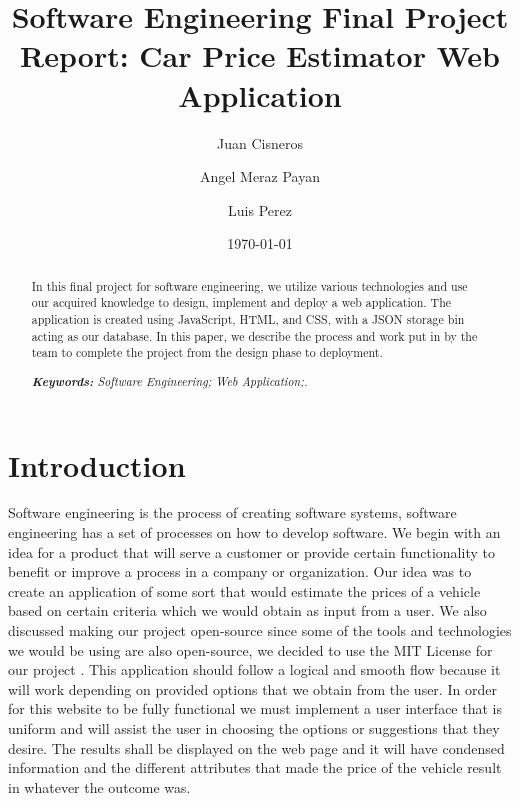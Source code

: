 \documentclass[12pt]{article}
\title{Software Engineering Final Project Report: Car Price Estimator Web Application
}
\author{Juan Cisneros\\%
    \href{mailto:firstauthor@ufl.edu}{} %
\and Angel Meraz Payan\\%
    \href{mailto:secondauthor@ufl.edu}{} %
\and Luis Perez\\%
    \href{mailto:thirdauthor@ufl.edu}{}%
    }
\date{\today}
\begin{document}
{
\maketitle
\begin{abstract}
In this final project for software engineering, we utilize various technologies and use our acquired knowledge to design, implement and deploy a web application. The application is created using JavaScript, HTML, and CSS, with a JSON storage bin acting as our database. In this paper, we describe the process and work put in by the team to complete the project from the design phase to deployment. 

\noindent
\textit{\textbf{Keywords: }%
Software Engineering; Web Application;.} \\ %
\noindent
\end{abstract}
}


\section{Introduction}

Software engineering is the process of creating software systems, software engineering has a set of processes on how to develop software. We begin with an idea for a product that will serve a customer or provide certain functionality to benefit or improve a process in a company or organization. Our idea was to create an application of some sort that would estimate the prices of a vehicle based on certain criteria which we would obtain as input from a user. We also discussed making our project open-source since some of the tools and technologies we would be using are also open-source, we decided to use the MIT License for our project \cite{MIT}. This application should follow a logical and smooth flow because it will work depending on provided options that we obtain from the user. In order for this website to be fully functional we must implement a user interface that is uniform and will assist the user in choosing the options or suggestions that they desire. The results shall be displayed on the web page and it will have condensed information and the different attributes that made the price of the vehicle result in whatever the outcome was. 
\end{document}
